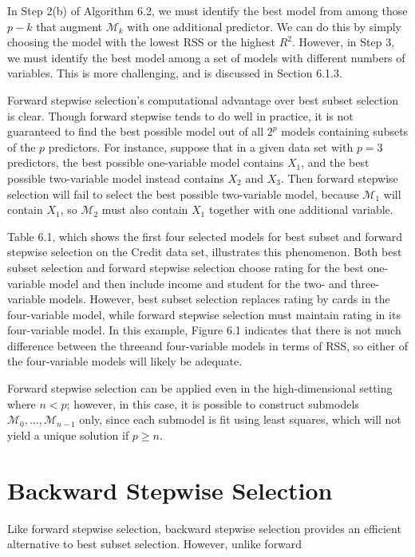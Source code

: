 \documentclass[10pt]{article}
\begin{document}
In Step 2(b) of Algorithm 6.2, we must identify the best model from among those $p-k$ that augment $\mathcal{M}_{k}$ with one additional predictor. We can do this by simply choosing the model with the lowest RSS or the highest $R^{2}$. However, in Step 3, we must identify the best model among a set of models with different numbers of variables. This is more challenging, and is discussed in Section 6.1.3.

Forward stepwise selection's computational advantage over best subset selection is clear. Though forward stepwise tends to do well in practice, it is not guaranteed to find the best possible model out of all $2^{p}$ models containing subsets of the $p$ predictors. For instance, suppose that in a given data set with $p=3$ predictors, the best possible one-variable model contains $X_{1}$, and the best possible two-variable model instead contains $X_{2}$ and $X_{3}$. Then forward stepwise selection will fail to select the best possible two-variable model, because $\mathcal{M}_{1}$ will contain $X_{1}$, so $\mathcal{M}_{2}$ must also contain $X_{1}$ together with one additional variable.

Table 6.1, which shows the first four selected models for best subset and forward stepwise selection on the Credit data set, illustrates this phenomenon. Both best subset selection and forward stepwise selection choose rating for the best one-variable model and then include income and student for the two- and three-variable models. However, best subset selection replaces rating by cards in the four-variable model, while forward stepwise selection must maintain rating in its four-variable model. In this example, Figure 6.1 indicates that there is not much difference between the threeand four-variable models in terms of RSS, so either of the four-variable models will likely be adequate.

Forward stepwise selection can be applied even in the high-dimensional setting where $n<p$; however, in this case, it is possible to construct submodels $\mathcal{M}_{0}, \ldots, \mathcal{M}_{n-1}$ only, since each submodel is fit using least squares, which will not yield a unique solution if $p \geq n$.

\section*{Backward Stepwise Selection}
Like forward stepwise selection, backward stepwise selection provides an efficient alternative to best subset selection. However, unlike forward
\end{document}
